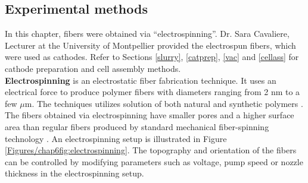 \subsection{Experimental methods}
In this chapter,  fibers were obtained via  \enquote{electrospinning}. Dr. Sara Cavaliere, Lecturer at the University of Montpellier provided the electrospun  fibers, which were used as cathodes. Refer to Sections \ref{slurry}, \ref{catprep}, \ref{vac} and \ref{cellass} for cathode preparation and cell assembly methods. \\
\textbf{Electrospinning} is an electrostatic fiber fabrication technique. It uses an electrical force to produce polymer fibers with diameters ranging from 2 nm to a few $\mu$m. The techniques utilizes solution of both natural and synthetic polymers \cite{bhardwaj_electrospinning_2010}. The fibers obtained via electrospinning have smaller pores and a higher surface area than regular fibers produced by standard mechanical fiber-spinning technology \cite{huang_review_2003}. An electrospinning setup is illustrated in Figure \ref{Figures/chap6fig:electrospinning}. The topography and orientation of the fibers can be controlled by modifying parameters such as voltage, pump speed or nozzle thickness in the electrospinning setup.

